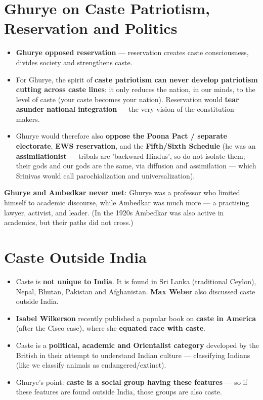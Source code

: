 \section{Ghurye on Caste Patriotism, Reservation and Politics}

\begin{CriticalPoint}
\begin{itemize}
\item \textbf{Ghurye opposed reservation} --- reservation creates caste consciousness, divides society and strengthens caste.
\item For Ghurye, the spirit of \textbf{caste patriotism can never develop patriotism cutting across caste lines}: it only reduces the nation, in our minds, to the level of caste (your caste becomes your nation). Reservation would \textbf{tear asunder national integration} --- the very vision of the constitution-makers.
\item Ghurye would therefore also \textbf{oppose the Poona Pact / separate electorate}, \textbf{EWS reservation}, and the \textbf{Fifth/Sixth Schedule} (he was an \textbf{assimilationist} --- tribals are 'backward Hindus', so do not isolate them; their gods and our gods are the same, via diffusion and assimilation --- which Srinivas would call parochialization and universalization).
\end{itemize}
\end{CriticalPoint}

\begin{ComparisonBox}
\textbf{Ghurye and Ambedkar never met}: Ghurye was a professor who limited himself to academic discourse, while Ambedkar was much more --- a practising lawyer, activist, and leader. (In the 1920s Ambedkar was also active in academics, but their paths did not cross.)
\end{ComparisonBox}

\section{Caste Outside India}

\begin{KeyConcept}
\begin{itemize}
\item Caste is \textbf{not unique to India}. It is found in Sri Lanka (traditional Ceylon), Nepal, Bhutan, Pakistan and Afghanistan. \textbf{Max Weber} also discussed caste outside India.
\item \textbf{Isabel Wilkerson} recently published a popular book on \textbf{caste in America} (after the Cisco case), where she \textbf{equated race with caste}.
\item Caste is a \textbf{political, academic and Orientalist category} developed by the British in their attempt to understand Indian culture --- classifying Indians (like we classify animals as endangered/extinct).
\item Ghurye's point: \textbf{caste is a social group having these features} --- so if these features are found outside India, those groups are also caste.
\end{itemize}
\end{KeyConcept}

